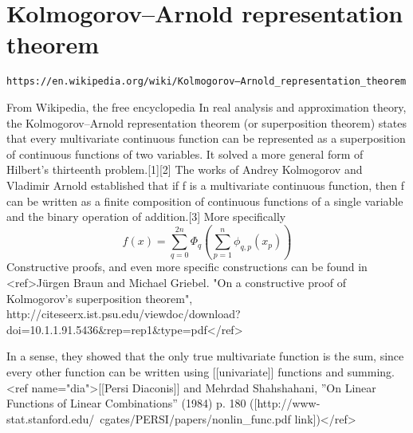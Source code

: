 \chapter{Kolmogorov–Arnold representation theorem}
\begin{verbatim}
https://en.wikipedia.org/wiki/Kolmogorov–Arnold_representation_theorem
\end{verbatim}
From Wikipedia, the free encyclopedia
In real analysis and approximation theory, the Kolmogorov–Arnold representation theorem (or superposition theorem) states that every multivariate continuous function can be represented as a superposition of continuous functions of two variables. It solved a more general form of Hilbert's thirteenth problem.[1][2]
The works of Andrey Kolmogorov and Vladimir Arnold established that if f is a multivariate continuous function, then f can be written as a finite composition of continuous functions of a single variable and the binary operation of addition.[3]
More specifically
$$
f(x)=\sum_{q=0}^{2n}\Phi_q\left(\sum_{p=1}^n\phi_{q,p}(x_p)\right)
$$
Constructive proofs, and even more specific constructions can be found in <ref>Jürgen Braun and Michael Griebel. "On a constructive proof of Kolmogorov’s superposition theorem", http://citeseerx.ist.psu.edu/viewdoc/download?doi=10.1.1.91.5436&rep=rep1&type=pdf</ref>

In a sense, they showed that the only true multivariate function is the sum, since every other function can be written using [[univariate]] functions and summing.<ref name="dia">[[Persi Diaconis]] and Mehrdad Shahshahani, ''On Linear Functions of Linear Combinations'' (1984) p. 180 ([http://www-stat.stanford.edu/~cgates/PERSI/papers/nonlin_func.pdf link])</ref>

